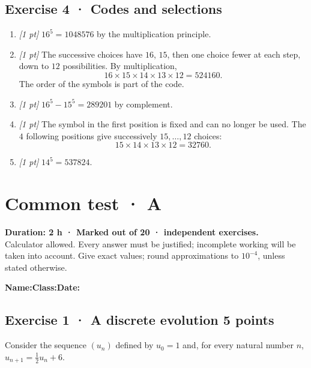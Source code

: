 \subsection*{Exercise 4 · Codes and selections}\begin{enumerate}

\item \textit{[1 pt]} $16^5=1048576$ by the multiplication principle.

\item \textit{[1 pt]} The successive choices have $16$, $15$, then one choice fewer at each step, down to $12$ possibilities. By multiplication,
\[16\times15\times14\times13\times12=524160.\]
The order of the symbols is part of the code.

\item \textit{[1 pt]} $16^5-15^5=289201$ by complement.

\item \textit{[1 pt]} The symbol in the first position is fixed and can no longer be used. The $4$ following positions give successively $15,\ldots,12$ choices:
\[15\times14\times13\times12=32760.\]

\item \textit{[1 pt]} $14^5=537824$.

\end{enumerate}

\fi

\ifmxteacher

\mxnewpage{}\label{sujet:3-3}

\section*{Common test · A}


\textbf{Duration: 2 h · Marked out of 20 ·  independent exercises.}\\Calculator allowed. Every answer must be justified; incomplete working will be taken into account. Give exact values; round approximations to $10^{-4}$, unless stated otherwise.

\smallskip\textbf{Name:}\enspace\dotfill\quad\textbf{Class:}\enspace\dotfill\quad\textbf{Date:}\enspace\dotfill

\subsection*{Exercise 1 · A discrete evolution \hfill 5 points}Consider the sequence $(u_n)$ defined by $u_0=1$ and, for every natural number $n$, $u_{n+1}=\frac{1}{2}u_n+6$.

